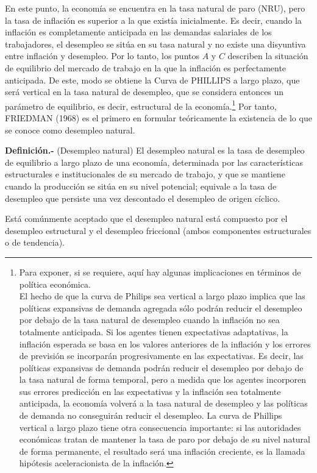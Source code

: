 \documentclass[10pt,a4paper]{article}
\begin{document}
En este punto, la economía se encuentra en la tasa natural de paro (NRU), pero la tasa de inflación es superior a la que existía inicialmente. Es decir, cuando la inflación es completamente anticipada en las demandas salariales de los trabajadores, el desempleo se sitúa en su tasa natural y no existe una disyuntiva entre inflación y desempleo. Por lo tanto, los puntos $A$ y $C$ describen la situación de equilibrio del mercado de trabajo en la que la inflación es perfectamente anticipada. De este, modo se obtiene la Curva de PHILLIPS a largo plazo, que será vertical en la tasa natural de desempleo, que se considera entonces un parámetro de equilibrio, es decir, estructural de la economía.\footnote{%
    Para exponer, si se requiere, aquí hay algunas implicaciones en términos de política económica.\\
El hecho de que la curva de Philips sea vertical a largo plazo implica que las políticas expansivas de demanda agregada sólo podrán reducir el desempleo por debajo de la tasa natural de desempleo cuando la inflación no sea totalmente anticipada. Si los agentes tienen expectativas adaptativas, la inflación esperada se basa en los valores anteriores de la inflación y los errores de previsión se incorparán progresivamente en las expectativas. Es decir, las políticas expansivas de demanda podrán reducir el desempleo por debajo de la tasa natural de forma temporal, pero a medida que los agentes incorporen sus errores predicción en las expectativas y la inflación sea totalmente anticipada, la economía volverá a la tasa natural de desempleo y las políticas de demanda no conseguirán reducir el desempleo. La curva de Phillips vertical a largo plazo tiene otra consecuencia importante: si las autoridades económicas tratan de mantener la tasa de paro por debajo de su nivel natural de forma permanente, el resultado será una inflación creciente, es la llamada hipótesis aceleracionista de la inflación.
} Por tanto, FRIEDMAN (1968) es el primero en formular teóricamente la existencia de lo que se conoce como desempleo natural.

\textbf{Definición.-} (Desempleo natural) El desempleo natural es la tasa de desempleo de equilibrio a largo plazo de una economía, determinada por las características estructurales e institucionales de su mercado de trabajo, y que se mantiene cuando la producción se sitúa en su nivel potencial; equivale a la tasa de desempleo que persiste una vez descontado el desempleo de origen cíclico. 

Está comúnmente aceptado que el desempleo natural está compuesto por el desempleo estructural y el desempleo friccional (ambos componentes estructurales o de tendencia).
\end{document}
